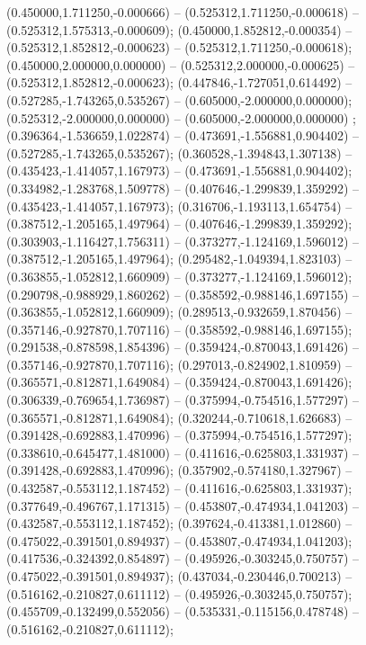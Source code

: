  (0.450000,1.711250,-0.000666) -- (0.525312,1.711250,-0.000618) -- (0.525312,1.575313,-0.000609);
 (0.450000,1.852812,-0.000354) -- (0.525312,1.852812,-0.000623) -- (0.525312,1.711250,-0.000618);
 (0.450000,2.000000,0.000000) -- (0.525312,2.000000,-0.000625) -- (0.525312,1.852812,-0.000623);
 (0.447846,-1.727051,0.614492) -- (0.527285,-1.743265,0.535267) -- (0.605000,-2.000000,0.000000);
 (0.525312,-2.000000,0.000000) -- (0.605000,-2.000000,0.000000) ;
 (0.396364,-1.536659,1.022874) -- (0.473691,-1.556881,0.904402) -- (0.527285,-1.743265,0.535267);
 (0.360528,-1.394843,1.307138) -- (0.435423,-1.414057,1.167973) -- (0.473691,-1.556881,0.904402);
 (0.334982,-1.283768,1.509778) -- (0.407646,-1.299839,1.359292) -- (0.435423,-1.414057,1.167973);
 (0.316706,-1.193113,1.654754) -- (0.387512,-1.205165,1.497964) -- (0.407646,-1.299839,1.359292);
 (0.303903,-1.116427,1.756311) -- (0.373277,-1.124169,1.596012) -- (0.387512,-1.205165,1.497964);
 (0.295482,-1.049394,1.823103) -- (0.363855,-1.052812,1.660909) -- (0.373277,-1.124169,1.596012);
 (0.290798,-0.988929,1.860262) -- (0.358592,-0.988146,1.697155) -- (0.363855,-1.052812,1.660909);
 (0.289513,-0.932659,1.870456) -- (0.357146,-0.927870,1.707116) -- (0.358592,-0.988146,1.697155);
 (0.291538,-0.878598,1.854396) -- (0.359424,-0.870043,1.691426) -- (0.357146,-0.927870,1.707116);
 (0.297013,-0.824902,1.810959) -- (0.365571,-0.812871,1.649084) -- (0.359424,-0.870043,1.691426);
 (0.306339,-0.769654,1.736987) -- (0.375994,-0.754516,1.577297) -- (0.365571,-0.812871,1.649084);
 (0.320244,-0.710618,1.626683) -- (0.391428,-0.692883,1.470996) -- (0.375994,-0.754516,1.577297);
 (0.338610,-0.645477,1.481000) -- (0.411616,-0.625803,1.331937) -- (0.391428,-0.692883,1.470996);
 (0.357902,-0.574180,1.327967) -- (0.432587,-0.553112,1.187452) -- (0.411616,-0.625803,1.331937);
 (0.377649,-0.496767,1.171315) -- (0.453807,-0.474934,1.041203) -- (0.432587,-0.553112,1.187452);
 (0.397624,-0.413381,1.012860) -- (0.475022,-0.391501,0.894937) -- (0.453807,-0.474934,1.041203);
 (0.417536,-0.324392,0.854897) -- (0.495926,-0.303245,0.750757) -- (0.475022,-0.391501,0.894937);
 (0.437034,-0.230446,0.700213) -- (0.516162,-0.210827,0.611112) -- (0.495926,-0.303245,0.750757);
 (0.455709,-0.132499,0.552056) -- (0.535331,-0.115156,0.478748) -- (0.516162,-0.210827,0.611112);
